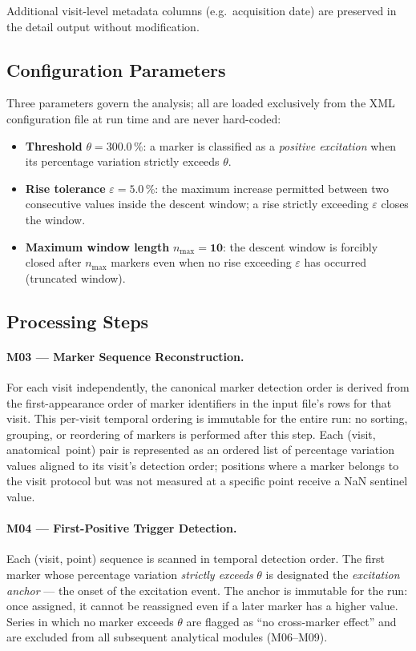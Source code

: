\documentclass[a4paper,11pt]{article}
\begin{document}
Additional visit-level metadata columns (e.g.\ acquisition date) are preserved in the
detail output without modification.

\subsection{Configuration Parameters}

Three parameters govern the analysis; all are loaded exclusively from the XML configuration
file at run time and are never hard-coded:

\begin{itemize}
  \item \textbf{Threshold} $\theta = \mathbf{300.0}\,\%$: a marker is
        classified as a \emph{positive excitation} when its percentage variation strictly
        exceeds $\theta$.
  \item \textbf{Rise tolerance} $\varepsilon = \mathbf{5.0}\,\%$: the maximum
        increase permitted between two consecutive values inside the descent window; a rise
        strictly exceeding $\varepsilon$ closes the window.
  \item \textbf{Maximum window length} $n_{\max} = \mathbf{10}$: the descent window
        is forcibly closed after $n_{\max}$ markers even when no rise exceeding $\varepsilon$
        has occurred (truncated window).
\end{itemize}

\subsection{Processing Steps}

\paragraph{M03 --- Marker Sequence Reconstruction.}
For each visit independently, the canonical marker detection order is derived from the
first-appearance order of marker identifiers in the input file's rows for that visit.
This per-visit temporal ordering is immutable for the entire run: no sorting, grouping, or
reordering of markers is performed after this step.
Each (visit, anatomical~point) pair is represented as an ordered list of percentage
variation values aligned to its visit's detection order; positions where a marker belongs
to the visit protocol but was not measured at a specific point receive a NaN sentinel value.

\paragraph{M04 --- First-Positive Trigger Detection.}
Each (visit, point) sequence is scanned in temporal detection order.
The first marker whose percentage variation \emph{strictly exceeds} $\theta$ is designated
the \emph{excitation anchor} --- the onset of the excitation event.
The anchor is immutable for the run: once assigned, it cannot be reassigned even if a later
marker has a higher value.
Series in which no marker exceeds $\theta$ are flagged as ``no cross-marker effect'' and
are excluded from all subsequent analytical modules (M06--M09).
\end{document}
